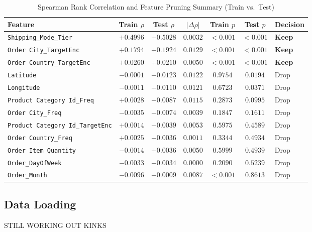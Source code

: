 \documentclass[runningheads]{llncs}
\begin{document}
    \begin{table}[!htbp]
        \centering
        \caption{Spearman Rank Correlation and Feature Pruning Summary (Train vs.\ Test)}
        \label{tab:spearman_summary}
        \begin{tabular}{lcccccl}
            \toprule
            \textbf{Feature} & \textbf{Train $\rho$} & \textbf{Test $\rho$} & \textbf{$|\Delta \rho|$} & \textbf{Train $p$} & \textbf{Test $p$} & \textbf{Decision} \\
            \midrule
            \texttt{Shipping\_Mode\_Tier} & $+0.4996$ & $+0.5028$ & $0.0032$ & $<0.001$ & $<0.001$ & \textbf{Keep} \\
            \texttt{Order City\_TargetEnc} & $+0.1794$ & $+0.1924$ & $0.0129$ & $<0.001$ & $<0.001$ & \textbf{Keep} \\
            \texttt{Order Country\_TargetEnc} & $+0.0260$ & $+0.0210$ & $0.0050$ & $<0.001$ & $<0.001$ & \textbf{Keep} \\
            \midrule
            \texttt{Latitude} & $-0.0001$ & $-0.0123$ & $0.0122$ & $0.9754$ & $0.0194$ & Drop \\
            \texttt{Longitude} & $-0.0011$ & $+0.0110$ & $0.0121$ & $0.6723$ & $0.0371$ & Drop \\
            \texttt{Product Category Id\_Freq} & $+0.0028$ & $-0.0087$ & $0.0115$ & $0.2873$ & $0.0995$ & Drop \\
            \texttt{Order City\_Freq} & $-0.0035$ & $-0.0074$ & $0.0039$ & $0.1847$ & $0.1611$ & Drop \\
            \texttt{Product Category Id\_TargetEnc} & $+0.0014$ & $-0.0039$ & $0.0053$ & $0.5975$ & $0.4589$ & Drop \\
            \texttt{Order Country\_Freq} & $+0.0025$ & $+0.0036$ & $0.0011$ & $0.3344$ & $0.4934$ & Drop \\
            \texttt{Order Item Quantity} & $-0.0014$ & $+0.0036$ & $0.0050$ & $0.5999$ & $0.4939$ & Drop \\
            \texttt{Order\_DayOfWeek} & $-0.0033$ & $-0.0034$ & $0.0000$ & $0.2090$ & $0.5239$ & Drop \\
            \texttt{Order\_Month} & $-0.0096$ & $-0.0009$ & $0.0087$ & $<0.001$ & $0.8613$ & Drop \\
            \bottomrule
        \end{tabular}
    \end{table}
 
\subsection{Data Loading}
STILL WORKING OUT KINKS
\end{document}
